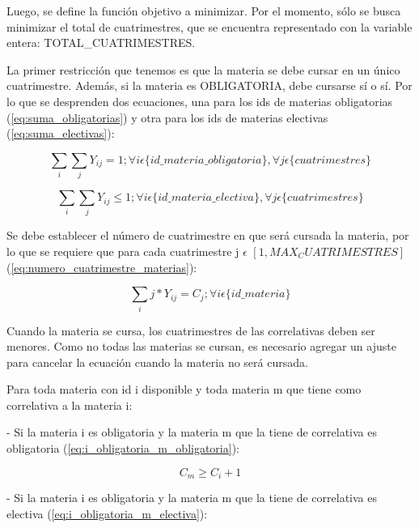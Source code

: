 \documentclass[a4paper]{article}
\begin{document}
Luego, se define la función objetivo a minimizar. Por el momento, sólo se busca minimizar el total de cuatrimestres, que se encuentra representado con la variable entera: TOTAL\_CUATRIMESTRES.

La primer restricción que tenemos es que la materia se debe cursar en un único cuatrimestre. Además, si la materia es OBLIGATORIA, debe cursarse sí o sí. Por lo que se desprenden dos ecuaciones, una para los ids de materias obligatorias (\ref{eq:suma_obligatorias}) y otra para los ids de materias electivas (\ref{eq:suma_electivas}):

\begin{equation}\label{eq:suma_obligatorias}
\sum_{i} \sum_{j} Y_{ij} = 1 ; \forall i \epsilon \{id\_materia\_obligatoria\}, \forall j \epsilon \{cuatrimestres\}
\end{equation}

\begin{equation}\label{eq:suma_electivas}
\sum_{i} \sum_{j} Y_{ij} \leq 1 ; \forall i \epsilon \{id\_materia\_electiva\}, \forall j \epsilon \{cuatrimestres\}
\end{equation}

Se debe establecer el número de cuatrimestre en que será cursada la materia, por lo que se requiere que para cada cuatrimestre j $\epsilon$ $[1, MAX_CUATRIMESTRES]$ (\ref{eq:numero_cuatrimestre_materias}):

\begin{equation}\label{eq:numero_cuatrimestre_materias}
\sum_{i} j * Y_{ij} = C_{j} ; \forall i \epsilon \{id\_materia\}
\end{equation}

Cuando la materia se cursa, los cuatrimestres de las correlativas deben ser menores. Como no todas las materias se cursan, es necesario agregar un ajuste para cancelar la ecuación cuando la materia no será cursada.

Para toda materia con id i disponible y toda materia m que tiene como correlativa a la materia i:

- Si la materia i es obligatoria y la materia m que la tiene de correlativa es obligatoria (\ref{eq:i_obligatoria_m_obligatoria}):

\begin{equation}\label{eq:i_obligatoria_m_obligatoria}
C_m \geq C_i + 1
\end{equation}

- Si la materia i es obligatoria y la materia m que la tiene de correlativa es electiva (\ref{eq:i_obligatoria_m_electiva}):
\end{document}
